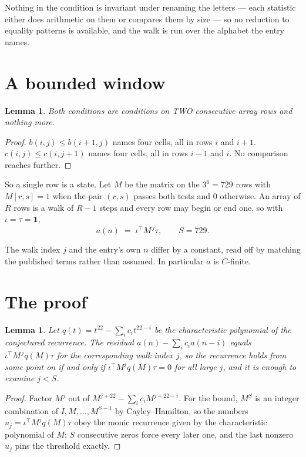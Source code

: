 \documentclass[11pt,a4paper]{article}
\theoremstyle{plain}
\newtheorem{lemma}[theorem]{Lemma}
\theoremstyle{definition}
\begin{document}
Nothing in the condition is invariant under renaming the letters --- each statistic either does
arithmetic on them or compares them by size --- so no reduction to equality patterns is
available, and the walk is run over the alphabet the entry names.

\section{A bounded window}

\begin{lemma}\label{lem:win}
Both conditions are conditions on TWO consecutive array rows and nothing more.
\end{lemma}

\begin{proof}
$b(i,j)\le b(i{+}1,j)$ names four cells, all in rows $i$ and $i+1$. $c(i,j)\le c(i,j{+}1)$
names four cells, all in rows $i-1$ and $i$. No comparison reaches further.
\end{proof}

So a single row is a state. Let $M$ be the matrix on the $3^{6}=729$ rows with
$M[r,s]=1$ when the pair $(r,s)$ passes both tests and $0$ otherwise. An array of $R$ rows is a
walk of $R-1$ steps and every row may begin or end one, so with $\iota=\tau=\mathbf{1}$,
\[
a(n)\;=\;\iota^{\!\top}M^{\,j}\tau ,\qquad S=729.
\]

The walk index $j$ and the entry's own $n$ differ by a constant, read off by matching the
published terms rather than assumed. In particular $a$ is $C$-finite.

\section{The proof}

\begin{lemma}\label{lem:crit}
Let $q(t)=t^{22}-\sum_i c_it^{22-i}$ be the characteristic polynomial of the
conjectured recurrence. The residual $a(n)-\sum_ic_ia(n-i)$ equals
$\iota^{\!\top}M^{\,j}q(M)\tau$ for the corresponding walk index $j$, so the recurrence
holds from some point on if and only if $\iota^{\!\top}M^{j}q(M)\tau=0$ for all large $j$,
and it is enough to examine $j<S$.
\end{lemma}

\begin{proof}
Factor $M^{j}$ out of $M^{j+22}-\sum_ic_iM^{j+22-i}$. For the bound, $M^{S}$
is an integer combination of $I,M,\dots,M^{S-1}$ by Cayley--Hamilton, so the numbers
$u_j=\iota^{\!\top}M^{j}q(M)\tau$ obey the monic recurrence given by the characteristic
polynomial of $M$; $S$ consecutive zeros force every later one, and the last nonzero $u_j$
pins the threshold exactly.
\end{proof}
\end{document}
